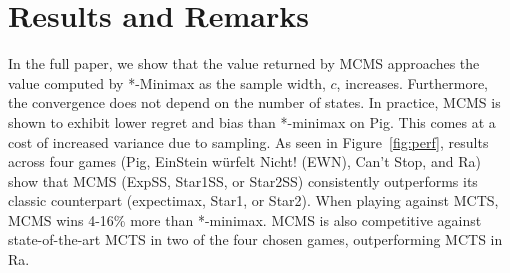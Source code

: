 \documentclass{article}
\begin{document}
\section{Results and Remarks}

In the full paper, we show that the value returned by MCMS approaches the value computed 
by *-Minimax as the sample width, $c$, increases. 
Furthermore, the convergence does not depend on the number of states. 
In practice, MCMS is shown to exhibit lower regret and bias than *-minimax on Pig. 
This comes at a cost of increased variance due to sampling. 
As seen in Figure~\ref{fig:perf}, results across four games (Pig, EinStein w\"{u}rfelt Nicht! (EWN), Can't Stop, and Ra)
show that MCMS (ExpSS, Star1SS, or Star2SS) 
consistently outperforms its classic counterpart (expectimax, Star1, or Star2). 
When playing against MCTS, MCMS wins 4-16\% more than *-minimax. 
MCMS is also competitive against state-of-the-art MCTS in two of the four chosen games, outperforming 
MCTS in Ra. 



\end{document}
